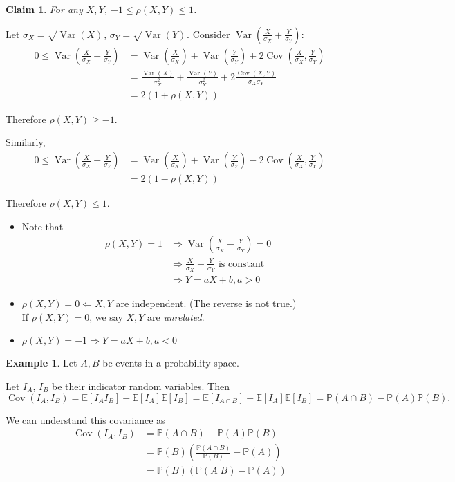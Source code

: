 \documentclass[a4paper,11pt]{amsbook}
\makeatletter
\renewenvironment{proof}[1][\proofname]{\par
    \pushQED{\qed}%
    \normalfont \topsep6\p@\@plus6\p@\relax
    \trivlist
    \itemindent\z@ %
    \item[\hskip\labelsep
          \scshape
      #1\@addpunct{.}]\ignorespaces
}{%
    \popQED\endtrivlist\@endpefalse
}
\newtheorem{claim}{\hspace{-2em} \color{darkblue} Claim}[chapter]
\theoremstyle{definition}
\newtheorem{example}{\hspace{-2em} \color{darkblue} Example}[chapter]
\theoremstyle{remark}
\newcommand{\E}{\mathbb{E}}
\renewcommand{\P}{\mathbb{P}}
\DeclareMathOperator\Var{Var}
\DeclareMathOperator\Cov{Cov}
\newcommand\0{\varnothing}
\makeatother
\begin{document}
\begin{claim}
    For any $X,Y$, $-1\leq\rho(X,Y)\leq1$.
\end{claim}
\begin{proof}
    Let $\sigma_X=\sqrt{\Var(X)}$, $\sigma_Y=\sqrt{\Var(Y)}$.
    Consider $\Var\left(\frac{X}{\sigma_X}+\frac{Y}{\sigma_Y}\right)$:
    \begin{align*}
        0\leq\Var\left(\frac{X}{\sigma_X}+\frac{Y}{\sigma_Y}\right)&=\Var\left(\frac{X}{\sigma_X}\right)+\Var\left(\frac{Y}{\sigma_Y}\right)+2\Cov\left(\frac{X}{\sigma_X},\frac{Y}{\sigma_Y}\right) \\
        &=\frac{\Var(X)}{\sigma_X^2}+\frac{\Var(Y)}{\sigma_Y^2}+2\frac{\Cov(X,Y)}{\sigma_X\sigma_Y} \\
        &=2(1+\rho(X,Y))
    \end{align*}

    Therefore $\rho(X,Y)\geq-1$.

    Similarly, \begin{align*}
        0\leq\Var\left(\frac{X}{\sigma_X}-\frac{Y}{\sigma_Y}\right)&=\Var\left(\frac{X}{\sigma_X}\right)+\Var\left(\frac{Y}{\sigma_Y}\right)-2\Cov\left(\frac{X}{\sigma_X},\frac{Y}{\sigma_Y}\right) \\
       &=2(1-\rho(X,Y))
    \end{align*}

    Therefore $\rho(X,Y)\leq1$.
\end{proof}

\begin{itemize}
    \item Note that \begin{align*}
        \rho(X,Y)=1&\Rightarrow\Var\left(\frac{X}{\sigma_X}-\frac{Y}{\sigma_Y}\right)=0 \\
        &\Rightarrow\frac{X}{\sigma_X}-\frac{Y}{\sigma_Y}\text{ is constant} \\
        &\Rightarrow Y=aX+b,a>0
    \end{align*}
    \item $\rho(X,Y)=0\Leftarrow X,Y$ are independent. (The reverse is not true.) \\
    If $\rho(X,Y)=0$, we say $X,Y$ are \emph{unrelated}.
    \item $\rho(X,Y)=-1\Rightarrow Y=aX+b,a<0$ \\
\end{itemize}

\begin{example}
    Let $A,B$ be events in a probability space.

    Let $I_A$, $I_B$ be their indicator random variables.
    Then $$\Cov(I_A,I_B)=\E[I_AI_B]-\E[I_A]\E[I_B]=\E[I_{A\cap B}]-\E[I_A]\E[I_B]=\P(A\cap B)-\P(A)\P(B).$$

    We can understand this covariance as \begin{align*}
        \Cov(I_A,I_B)&=\P(A\cap B)-\P(A)\P(B) \\
        &=\P(B)\left(\frac{\P(A\cap B)}{\P(B)}-\P(A)\right) \\
        &=\P(B)\left(\P(A|B)-\P(A)\right)
    \end{align*}
\end{example}
\end{document}

